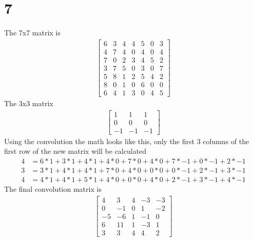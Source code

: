 \documentclass[12pt,english]{article}
\begin{document}
\section*{7}
The 7x7 matrix is
\begin{align*}
\begin{bmatrix}6&3&4&4&5&0&3\\4&7&4&0&4&0&4\\7&0&2&3&4&5&2\\3&7&5&0&3&0&7\\5&8&1&2&5&4&2\\8&0&1&0&6&0&0\\6&4&1&3&0&4&5\end{bmatrix}
\end{align*}
The 3x3 matrix
\begin{align*}
\begin{bmatrix} 1 & 1 & 1\\ 0 & 0 & 0\\ -1 & -1 & -1\end{bmatrix}
\end{align*}
Using the convolution the math looks like this, only the first 3 columns of the first row of the new matrix will be calculated
\begin{align*}
4 &= 6*1 + 3*1 + 4*1 + 4*0 + 7*0 + 4*0 + 7*-1 + 0*-1 + 2 *-1\\
3 &= 3*1 + 4*1 + 4*1 + 7*0 + 4*0 + 0*0 + 0*-1 + 2*-1 + 3 *-1\\
4 &= 4*1 + 4*1 + 5*1 + 4*0 + 0*0 + 4*0 + 2*-1 + 3*-1 + 4 *-1
\end{align*}
The final convolution matrix is
\begin{align*}
\begin{bmatrix} 4 & 3 & 4 & -3 & -3\\ 0 & -1 & 0 & 1 & -2\\ -5 & -6 & 1 & -1 & 0\\ 6 & 11 & 1 & -3 & 1\\ 3 & 3 & 4 & 4 & 2\end{bmatrix}
\end{align*}
\end{document}
